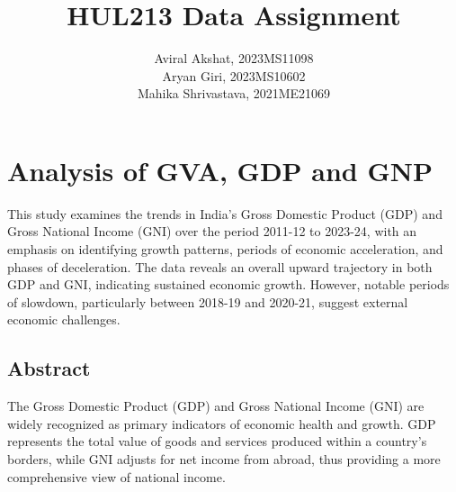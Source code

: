 \documentclass[a4paper,12pt]{extarticle} %
\begin{document}
\title{HUL213 Data Assignment}
\author{Aviral Akshat, 2023MS11098 \\ Aryan Giri, 2023MS10602 \\ Mahika Shrivastava, 2021ME21069}
\date{}


\maketitle

\tableofcontents %
\clearpage %
\section{Analysis of GVA, GDP and GNP}
\noindent This study examines the trends in India’s Gross Domestic Product (GDP) and Gross National Income (GNI) over the period 2011-12 to 2023-24, with an emphasis on identifying growth patterns, periods of economic acceleration, and phases of deceleration. The data reveals an overall upward trajectory in both GDP and GNI, indicating sustained economic growth. However, notable periods of slowdown, particularly between 2018-19 and 2020-21, suggest external economic challenges.\\





\subsection{Abstract}
The Gross Domestic Product (GDP) and Gross National Income (GNI) are widely recognized as primary indicators of economic health and growth. GDP represents the total value of goods and services produced within a country’s borders, while GNI adjusts for net income from abroad, thus providing a more comprehensive view of national income.\\ \cite{hb202312}\cite{hb202212}\cite{hb202112}\cite{hb202012}\cite{hb201912}\cite{hb201812}
\end{document}
